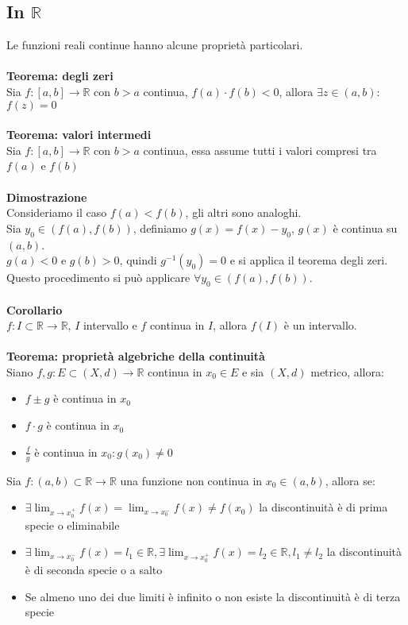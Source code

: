 \documentclass{article}
\begin{document}
\subsection{In $\mathds{R}$}
Le funzioni reali continue hanno alcune proprietà particolari.\\\\
\textbf{Teorema: degli zeri}\\
Sia $f:[a,b]\rightarrow\mathds{R}$ con $b>a$ continua, $f(a)\cdot f(b)<0$, allora $\exists z\in(a,b):$ $f(z)=0$\\\\
\textbf{Teorema: valori intermedi}\\
Sia $f:[a,b]\rightarrow\mathds{R}$ con $b>a$ continua, essa assume tutti i valori compresi tra $f(a)$ e $f(b)$\\\\
\textbf{Dimostrazione}\\
Consideriamo il caso $f(a)<f(b)$, gli altri sono analoghi. \\
Sia $y_0\in(f(a),f(b))$, definiamo $g(x)=f(x)-y_0$, $g(x)$ è continua su $(a,b)$.\\
$g(a)<0$ e $g(b)>0$, quindi $g^{-1}(y_0)=0$ e si applica il teorema degli zeri. Questo procedimento si può applicare $\forall y_0\in(f(a),f(b))$.\\
\\
\textbf{Corollario}\\
$f:I\subset\mathds{R}\rightarrow\mathds{R}$, $I$ intervallo e $f$ continua in $I$, allora $f(I)$ è un intervallo.\\\\
\textbf{Teorema: proprietà algebriche della continuità}\\
Siano $f,g:E\subset(X,d)\rightarrow\mathds{R}$ continua in $x_0\in E$ e sia $(X,d)$ metrico, allora:
\begin{itemize}
    \item $f\pm g$ è continua in $x_0$
    \item $f\cdot g$ è continua in $x_0$
    \item $\frac{f}{g}$ è continua in $x_0:g(x_0)\neq0$
\end{itemize}
Sia $f:(a,b)\subset\mathds{R}\rightarrow\mathds{R}$ una funzione non continua in $x_0\in(a,b)$, allora se:
\begin{itemize}
    \item $\exists\lim_{x\rightarrow x_0^+}f(x)=\lim_{x\rightarrow x_0^-}f(x)\neq f(x_0)$ la discontinuità è di prima specie o eliminabile
    \item $\exists\lim_{x\rightarrow x_0^-}f(x)=l_1\in\mathds{R}, \exists\lim_{x\rightarrow x_0^+}f(x)=l_2\in\mathds{R}, l_1\neq l_2$ la discontinuità è di seconda specie o a salto
    \item Se almeno uno dei due limiti è infinito o non esiste la discontinuità è di terza specie
\end{itemize}
\end{document}
